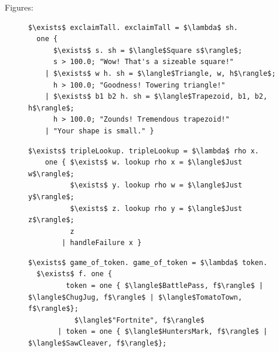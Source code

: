 \documentclass[article,screen,12pt, nonacm]{acmart}
\begin{document}
    Figures: 

    \begin{figure}[ht] 
        \begin{minipage}[h]{0.54\linewidth}
          \verselst
          \begin{lstlisting}[numbers=none, basicstyle=\tiny, xleftmargin=.2em,
                            showstringspaces=false,
                            frame=single]
$\exists$ exclaimTall. exclaimTall = $\lambda$ sh. 
  one { 
      $\exists$ s. sh = $\langle$Square s$\rangle$; 
      s > 100.0; "Wow! That's a sizeable square!"
    | $\exists$ w h. sh = $\langle$Triangle, w, h$\rangle$; 
      h > 100.0; "Goodness! Towering triangle!"
    | $\exists$ b1 b2 h. sh = $\langle$Trapezoid, b1, b2, h$\rangle$;
      h > 100.0; "Zounds! Tremendous trapezoid!"
    | "Your shape is small." }
            \end{lstlisting}
            \label{fig:verseexclaimtall} 
        \end{minipage}%
        \begin{minipage}[h]{0.5\linewidth}
          \verselst
          \begin{lstlisting}[numbers=none, basicstyle=\tiny, xleftmargin=2em,
                        frame=single]
$\exists$ tripleLookup. tripleLookup = $\lambda$ rho x. 
    one { $\exists$ w. lookup rho x = $\langle$Just w$\rangle$; 
          $\exists$ y. lookup rho w = $\langle$Just y$\rangle$; 
          $\exists$ z. lookup rho y = $\langle$Just z$\rangle$;
          z
        | handleFailure x }
          \end{lstlisting}
            \label{fig:versetriplelookup} 
        \vspace{4ex}
        \end{minipage} 
        \begin{minipage}[h]{\linewidth}
          \verselst
          \begin{lstlisting}[numbers=none, basicstyle=\tiny, xleftmargin=9em, 
                            frame=single, showstringspaces=false]
$\exists$ game_of_token. game_of_token = $\lambda$ token. 
  $\exists$ f. one {
         token = one { $\langle$BattlePass, f$\rangle$ | $\langle$ChugJug, f$\rangle$ | $\langle$TomatoTown, f$\rangle$}; 
           $\langle$"Fortnite", f$\rangle$
       | token = one { $\langle$HuntersMark, f$\rangle$ | $\langle$SawCleaver, f$\rangle$}; 

\end{lstlisting}
\end{minipage}
\end{figure}
\end{document}
